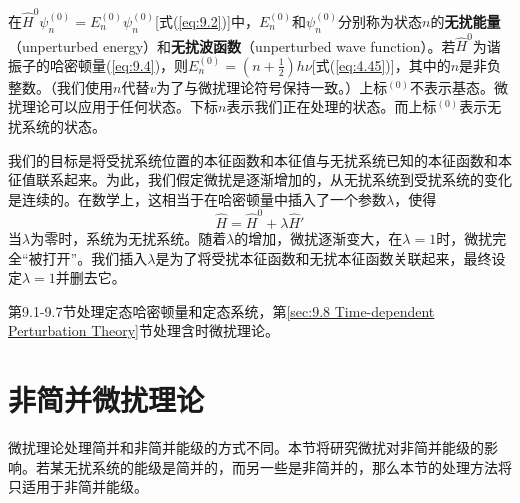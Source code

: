     在$\hat{H}^0 \psi_n^{\left(0\right)} = E_n^{\left(0\right)} \psi_n^{\left(0\right)}$[式(\ref{eq:9.2})]中，$E_n^{\left(0\right)}$和$\psi_n^{\left(0\right)}$分别称为状态$n$的\textbf{无扰能量}（unperturbed energy）和\textbf{无扰波函数}（unperturbed wave function）。若$\hat{H}^0$为谐振子的哈密顿量(\ref{eq:9.4})，则$E_n^{\left(0\right)} = \left(n + \frac{1}{2}\right)h\nu$[式(\ref{eq:4.45})]，其中的$n$是非负整数。（我们使用$n$代替$v$为了与微扰理论符号保持一致。）上标$^{(0)}$不表示基态。微扰理论可以应用于任何状态。下标$n$表示我们正在处理的状态。而上标$^{(0)}$表示无扰系统的状态。

    我们的目标是将受扰系统位置的本征函数和本征值与无扰系统已知的本征函数和本征值联系起来。为此，我们假定微扰是逐渐增加的，从无扰系统到受扰系统的变化是连续的。在数学上，这相当于在哈密顿量中插入了一个参数$\lambda$，使得
    \begin{equation}
        \hat{H} = \hat{H}^0 + \lambda \hat{H}'
        \label{eq:9.7}
    \end{equation}
    当$\lambda$为零时，系统为无扰系统。随着$\lambda$的增加，微扰逐渐变大，在$\lambda=1$时，微扰完全“被打开”。我们插入$\lambda$是为了将受扰本征函数和无扰本征函数关联起来，最终设定$\lambda=1$并删去它。

    第9.1-9.7节处理定态哈密顿量和定态系统，第\ref{sec:9.8 Time-dependent Perturbation Theory}节处理含时微扰理论。

\section{非简并微扰理论}
\label{sec:9.2 Nondegenerate Perturbation Theory}
    微扰理论处理简并和非简并能级的方式不同。本节将研究微扰对非简并能级的影响。若某无扰系统的能级是简并的，而另一些是非简并的，那么本节的处理方法将只适用于非简并能级。

